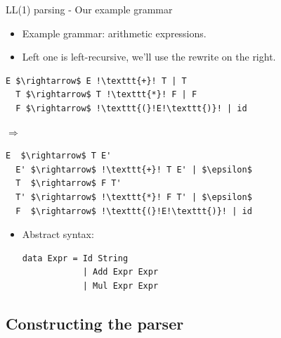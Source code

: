 \documentclass[10pt]{beamer}
\begin{document}
\begin{frame}[fragile]{LL(1) parsing - Our example grammar}

\begin{itemize}
\item Example grammar: arithmetic expressions.
\item Left one is left-recursive, we'll use the rewrite on the right.
\end{itemize}

\begin{minipage}[t]{0.45\textwidth}
\begin{lstlisting}[mathescape=true, escapechar=!]
  E $\rightarrow$ E !\texttt{+}! T | T
  T $\rightarrow$ T !\texttt{*}! F | F
  F $\rightarrow$ !\texttt{(}!E!\texttt{)}! | id
\end{lstlisting}
\end{minipage}
\hfill
\begin{minipage}[t]{0.05\textwidth}
  $\Rightarrow$ 
\end{minipage}
\hfill
\begin{minipage}[t]{0.45\textwidth}
\begin{lstlisting}[mathescape=true, escapechar=!]
  E  $\rightarrow$ T E'
  E' $\rightarrow$ !\texttt{+}! T E' | $\epsilon$
  T  $\rightarrow$ F T'
  T' $\rightarrow$ !\texttt{*}! F T' | $\epsilon$
  F  $\rightarrow$ !\texttt{(}!E!\texttt{)}! | id
\end{lstlisting}
\end{minipage}

\begin{itemize}
\item Abstract syntax:
\begin{lstlisting}[mathescape=true, escapechar=!]
  data Expr = Id String 
            | Add Expr Expr
            | Mul Expr Expr
\end{lstlisting}
\end{itemize}

\end{frame}

\subsection{Constructing the parser}
\end{document}

